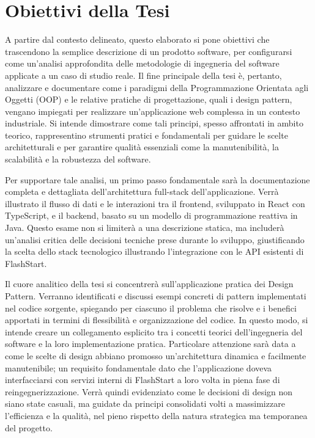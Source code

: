 \documentclass[12pt,a4paper,openright,twoside]{book}
\begin{document}
\section{Obiettivi della Tesi}
\label{sec:obiettivi_tesi}

A partire dal contesto delineato, questo elaborato si pone obiettivi che trascendono la semplice descrizione di un prodotto software, per configurarsi come un'analisi approfondita delle metodologie di ingegneria del software applicate a un caso di studio reale. Il fine principale della tesi è, pertanto, analizzare e documentare come i paradigmi della Programmazione Orientata agli Oggetti (OOP) e le relative pratiche di progettazione, quali i design pattern, vengano impiegati per realizzare un'applicazione web complessa in un contesto industriale. Si intende dimostrare come tali principi, spesso affrontati in ambito teorico, rappresentino strumenti pratici e fondamentali per guidare le scelte architetturali e per garantire qualità essenziali come la manutenibilità, la scalabilità e la robustezza del software.

Per supportare tale analisi, un primo passo fondamentale sarà la documentazione completa e dettagliata dell'architettura full-stack dell'applicazione. Verrà illustrato il flusso di dati e le interazioni tra il frontend, sviluppato in React con TypeScript, e il backend, basato su un modello di programmazione reattiva in Java. Questo esame non si limiterà a una descrizione statica, ma includerà un'analisi critica delle decisioni tecniche prese durante lo sviluppo, giustificando la scelta dello stack tecnologico illustrando l'integrazione con le API esistenti di FlashStart.

Il cuore analitico della tesi si concentrerà sull'applicazione pratica dei Design Pattern. Verranno identificati e discussi esempi concreti di pattern implementati nel codice sorgente, spiegando per ciascuno il problema che risolve e i benefici apportati in termini di flessibilità e organizzazione del codice. In questo modo, si intende creare un collegamento esplicito tra i concetti teorici dell'ingegneria del software e la loro implementazione pratica. Particolare attenzione sarà data a come le scelte di design abbiano promosso un'architettura dinamica e facilmente manutenibile; un requisito fondamentale dato che l'applicazione doveva interfacciarsi con servizi interni di FlashStart a loro volta in piena fase di reingegnerizzazione. Verrà quindi evidenziato come le decisioni di design non siano state casuali, ma guidate da principi consolidati volti a massimizzare l'efficienza e la qualità, nel pieno rispetto della natura strategica ma temporanea del progetto.
\end{document}

